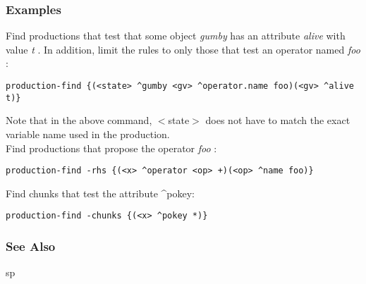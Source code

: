 \subsubsection*{Examples}
 Find productions that test that some object \emph{gumby}
 has an attribute \emph{alive}
 with value \emph{t}
. In addition, limit the rules to only those that test an operator named \emph{foo}
: \begin{verbatim}
production-find {(<state> ^gumby <gv> ^operator.name foo)(<gv> ^alive t)} 
\end{verbatim}
 Note that in the above command, $<$state$>$ does not have to match the exact variable name used in the production. \\ 
 Find productions that propose the operator \emph{foo}
: \begin{verbatim}
production-find -rhs {(<x> ^operator <op> +)(<op> ^name foo)}
\end{verbatim}
 Find chunks that test the attribute \^{}pokey: \begin{verbatim}
production-find -chunks {(<x> ^pokey *)}
\end{verbatim}
\subsubsection*{See Also}
 sp

